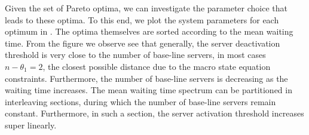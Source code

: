 Given the set of Pareto optima, we can investigate the parameter choice that leads to these optima.
To this end, we plot the system parameters for each optimum in .
The optima themselves are sorted according to the mean waiting time.
From the figure we observe see that generally, the server deactivation threshold is very close to the number of base-line servers, in most cases \(n - \theta_1 = 2\), the closest possible distance due to the macro state equation constraints.
Furthermore, the number of base-line servers is decreasing as the waiting time increases. 
The mean waiting time spectrum can be partitioned in interleaving sections, during which the number of base-line servers remain constant.
Furthermore, in such a section, the server activation threshold increases super linearly.
